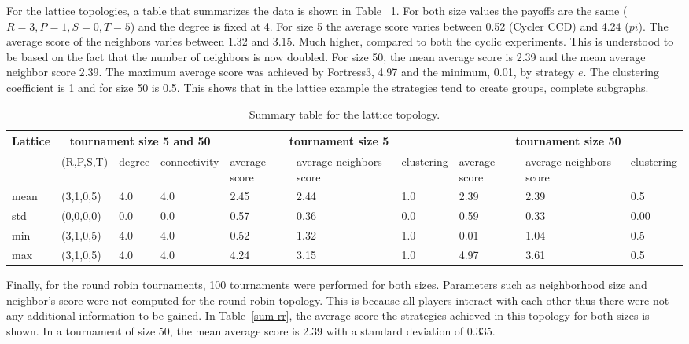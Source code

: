 For the lattice topologies, a table that summarizes the data is shown in Table
~\ref{sum-lattice}. For both size values the payoffs are the same (\(R=3, P=1,
S=0, T=5\)) and the degree is fixed at 4. For size 5 the average score
varies between 0.52 (Cycler CCD) and 4.24 ($pi$). The average score of the neighbors
varies between 1.32 and 3.15. Much higher, compared to both the cyclic experiments.
This is understood to be based on the fact that the number of neighbors is now
doubled. For size 50, the mean average score is 2.39 and the mean average neighbor
score 2.39. The maximum average score was achieved by Fortress3, 4.97 and the
minimum, 0.01, by strategy $e$. The clustering coefficient is 1 and for size
50 is 0.5. This shows that in the lattice example the strategies tend to create
groups, complete subgraphs.

\begin{table}[!hbtp]
\centering
\begin{adjustbox}{width=1\textwidth}
\small
\begin{tabular}{@{}|l|l|l|l|l|l|l|l|l|l|@{}}
\toprule
Lattice & \multicolumn{3}{c|}{tournament size 5 and 50} & \multicolumn{3}{c|}{tournament size 5} & \multicolumn{3}{c|}{tournament size 50}                            \\ \midrule
       & (R,P,S,T) & degree & connectivity & average score & average neighbors score & clustering & average score & average neighbors score & clustering \\ \midrule
mean   & (3,1,0,5) & 4.0    & 4.0          & 2.45      & 2.44           & 1.0        & 2.39      & 2.39             & 0.5        \\ \midrule
std    & (0,0,0,0) & 0.0    & 0.0          & 0.57      & 0.36           & 0.0        & 0.59      & 0.33             & 0.00       \\ \midrule
min    & (3,1,0,5) & 4.0    & 4.0          & 0.52      & 1.32           & 1.0        & 0.01      & 1.04             & 0.5        \\ \midrule
max    & (3,1,0,5) & 4.0    & 4.0          & 4.24      & 3.15           & 1.0        & 4.97      & 3.61             & 0.5        \\ \bottomrule
\end{tabular}
\end{adjustbox}
\caption{Summary table for the lattice topology.}
\label{sum-lattice}
\end{table}

Finally, for the round robin tournaments, 100 tournaments were performed for both
sizes. Parameters such as neighborhood size and neighbor's score
were not computed for the round robin topology. This is because all players
interact with each other thus there were not any additional information to be
gained. In Table~\ref{sum-rr}, the average score the strategies achieved
in this topology for both sizes is shown. In a tournament of size 50, the mean average
score is 2.39 with a standard deviation of 0.335.

